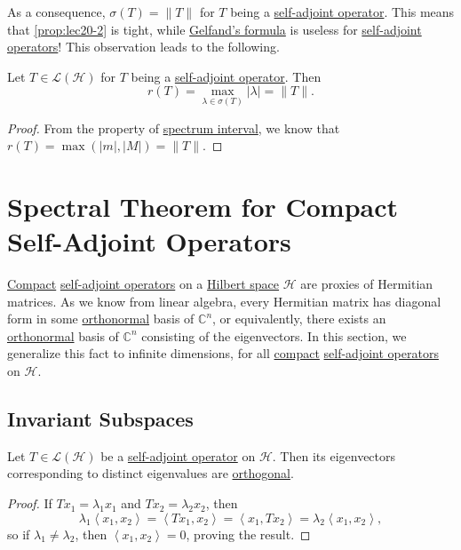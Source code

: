 As a consequence, \(\sigma (T) = \lVert T \rVert \) for \(T\) being a \hyperref[def:self-adjoint-op]{self-adjoint operator}. This means that \autoref{prop:lec20-2} is tight, while \hyperref[thm:Gelfand-formula]{Gelfand's formula} is useless for \hyperref[def:self-adjoint-op]{self-adjoint operators}! This observation leads to the following.

\begin{corollary}\label{col:spectral-radius}
	Let \(T\in \mathcal{L} (\mathcal{H} )\) for \(T\) being a \hyperref[def:self-adjoint-op]{self-adjoint operator}. Then
	\[
		r(T) = \max _{\lambda \in \sigma (T)} \vert \lambda \vert = \lVert T \rVert.
	\]
\end{corollary}
\begin{proof}
	From the property of \hyperref[thm:spectrum-interval]{spectrum interval}, we know that \(r(T) = \max (\vert m \vert , \vert M \vert ) = \lVert T \rVert\).
\end{proof}

\section{Spectral Theorem for Compact Self-Adjoint Operators}
\hyperref[def:compact-op]{Compact} \hyperref[def:self-adjoint-op]{self-adjoint operators} on a \hyperref[def:Hilbert-space]{Hilbert space} \(\mathcal{H} \) are proxies of Hermitian matrices. As we know from linear algebra, every Hermitian matrix has diagonal form in some \hyperref[def:orthonormal-system]{orthonormal} basis of \(\mathbb{C} ^n\), or equivalently, there exists an \hyperref[def:orthonormal-system]{orthonormal} basis of \(\mathbb{C} ^n\) consisting of the eigenvectors. In this section, we generalize this fact to infinite dimensions, for all \hyperref[def:compact-op]{compact} \hyperref[def:self-adjoint-op]{self-adjoint operators} on \(\mathcal{H} \).

\subsection{Invariant Subspaces}
\begin{proposition}\label{prop:eigenvectors-orthogonal}
	Let \(T\in \mathcal{L} (\mathcal{H} )\) be a \hyperref[def:self-adjoint-op]{self-adjoint operator} on \(\mathcal{H} \). Then its eigenvectors corresponding to distinct eigenvalues are \hyperref[def:orthogonal-system]{orthogonal}.
\end{proposition}
\begin{proof}
	If \(Tx_1 = \lambda _1 x_1\) and \(Tx_2 = \lambda _2 x_2\), then
	\[
		\lambda _1 \left\langle x_1, x_2 \right\rangle
		= \left\langle Tx_1, x_2 \right\rangle
		= \left\langle x_1, Tx_2 \right\rangle
		= \lambda _2 \left\langle x_1, x_2 \right\rangle,
	\]
	so if \(\lambda _1 \neq \lambda _2\), then \(\left\langle x_1, x_2 \right\rangle = 0\), proving the result.
\end{proof}

